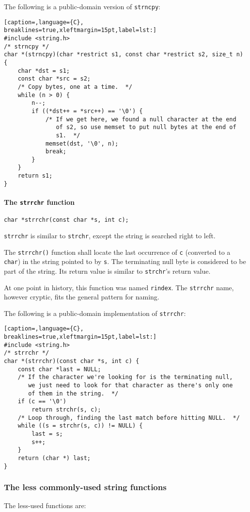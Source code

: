 The following is a public-domain version of \texttt{strncpy}:
\lstset{basicstyle=\scriptsize, numbers=left, captionpos=b, tabsize=4}
\begin{lstlisting}[caption=,language={C},
breaklines=true,xleftmargin=15pt,label=lst:]
#include <string.h>
/* strncpy */
char *(strncpy)(char *restrict s1, const char *restrict s2, size_t n) {
	char *dst = s1;
	const char *src = s2;
	/* Copy bytes, one at a time.  */
	while (n > 0) {
		n--;
		if ((*dst++ = *src++) == '\0') {
			/* If we get here, we found a null character at the end
			   of s2, so use memset to put null bytes at the end of
			   s1.  */
			memset(dst, '\0', n);
			break;
		}
	}
	return s1;
}
\end{lstlisting}

\paragraph{The \texttt{strrchr} function}
\texttt{char *strrchr(const char *s, int c);}

\texttt{strrchr} is similar to \texttt{strchr}, except the string is searched
right to left.

The \texttt{strrchr()} function shall locate the last occurrence of \texttt{c}
(converted to a \texttt{char}) in the string pointed to by \texttt{s}. The
terminating null byte is considered to be part of the string. Its return value
is similar to \texttt{strchr}'s return value.

At one point in history, this function was named \texttt{rindex}. The
\texttt{strrchr} name, however cryptic, fits the general pattern for naming.

The following is a public-domain implementation of \texttt{strrchr}:
\lstset{basicstyle=\scriptsize, numbers=left, captionpos=b, tabsize=4}
\begin{lstlisting}[caption=,language={C},
breaklines=true,xleftmargin=15pt,label=lst:]
#include <string.h>
/* strrchr */
char *(strrchr)(const char *s, int c) {
	const char *last = NULL;
	/* If the character we're looking for is the terminating null,
	   we just need to look for that character as there's only one
	   of them in the string.  */
	if (c == '\0')
		return strchr(s, c);
	/* Loop through, finding the last match before hitting NULL.  */
	while ((s = strchr(s, c)) != NULL) {
		last = s;
		s++;
	}
	return (char *) last;
}
\end{lstlisting}

\subsubsection{The less commonly-used string functions}
The less-used functions are:

